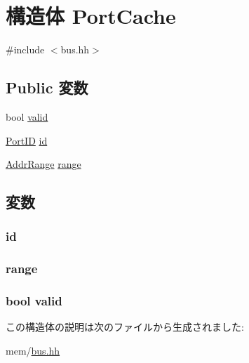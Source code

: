 \hypertarget{structBaseBus_1_1PortCache}{
\section{構造体 PortCache}
\label{structBaseBus_1_1PortCache}
}


{\ttfamily \#include $<$bus.hh$>$}\subsection*{Public 変数}
\begin{DoxyCompactItemize}
\item 
bool \hyperlink{structBaseBus_1_1PortCache_a28e3c179a86f337095088b3ca02a2b2a}{valid}
\item 
\hyperlink{base_2types_8hh_acef4d7d41cb21fdc252e20c04cd7bb8e}{PortID} \hyperlink{structBaseBus_1_1PortCache_a34ff492e343069602bcc51eb116a061f}{id}
\item 
\hyperlink{classAddrRange}{AddrRange} \hyperlink{structBaseBus_1_1PortCache_a194876a072a83a9fd59dde82e5213f0d}{range}
\end{DoxyCompactItemize}


\subsection{変数}
\hypertarget{structBaseBus_1_1PortCache_a34ff492e343069602bcc51eb116a061f}{
\subsubsection[{id}]{ {\bf id}}}
\label{structBaseBus_1_1PortCache_a34ff492e343069602bcc51eb116a061f}
\hypertarget{structBaseBus_1_1PortCache_a194876a072a83a9fd59dde82e5213f0d}{
\subsubsection[{range}]{ {\bf range}}}
\label{structBaseBus_1_1PortCache_a194876a072a83a9fd59dde82e5213f0d}
\hypertarget{structBaseBus_1_1PortCache_a28e3c179a86f337095088b3ca02a2b2a}{
\subsubsection[{valid}]{\setlength{\rightskip}{0pt plus 5cm}bool {\bf valid}}}
\label{structBaseBus_1_1PortCache_a28e3c179a86f337095088b3ca02a2b2a}


この構造体の説明は次のファイルから生成されました:\begin{DoxyCompactItemize}
\item 
mem/\hyperlink{bus_8hh}{bus.hh}\end{DoxyCompactItemize}
